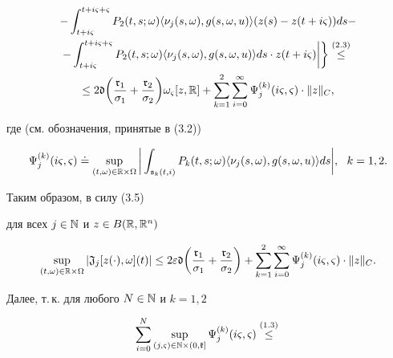 \begin{pf}
\begin{gather*}
-\int_{t+i\vsg}^{t+i\vsg+\vsg}


P_{2}(t,s;\om)\la\nu_{j}(s,\om),g(s,\om,u)\ra


(z(s)-z(t+i\vsg))ds-\\


%


-\int_{t+i\vsg}^{t+i\vsg+\vsg} P_{2}(t,s;\om)


\la\nu_{j}(s,\om),g(s,\om,u)\ra ds\cdot z(t+i\vsg)\bigg|\bigg\}


\overset{(2.3)}{\le}{} \\


%


\le 2\frak d\bigg(\frac{\frak r_{1}}{\sigma_{1}}+


\frac{\frak r_{2}}{\sigma_{2}}\bigg)\om_{\vsg}[z,\R]


+\sum\lt_{k=1}^{2}\sum\lt_{i=0}^{\infty}\Psi_{j}^{(k)}(i\vsg,\vsg)\cdot


\|z\|_{C},


\end{gather*}


где (см. обозначения, принятые в (3.2))


$$


\Psi_{j}^{(k)}(i\vsg,\vsg)\doteq\sup\lt_{(t,\om)\in\R\times\Om}


\bigg|\int_{\frak s_{k}(t,i)}P_{k}(t,s;\om)


\la\nu_{j}(s,\om),g(s,\om,u)\ra ds\bigg|,\ \ k=1,2.


$$


Таким образом, в силу (3.5)


для всех $j\in\Bbb N$ и $z\in B(\Bbb R,\Bbb R^{n})$


$$


\sup\lt_{(t,\om)\in\R\times\Om}|\frak J_{j}[z(\cdot),\om](t)|\le


2\ve\frak d\bigg(\frac{\frak r_{1}}{\sigma_{1}}+


\frac{\frak r_{2}}{\sigma_{2}}\bigg)+


\sum\lt_{k=1}^{2}\sum\lt_{i=0}^{\infty}


\Psi_{j}^{(k)}(i\vsg,\vsg)\cdot\|z\|_{C}.


$$


Далее, т.\,к. для любого $N \in \Bbb N$ и $k=1,2$


\begin{equation}


\sum\lt_{i=0}^{N}


\sup_{(j,\vsg)\in\Bbb N\times(0,\frak k]}


\Psi_{j}^{(k)}(i\vsg,\vsg)\overset{(1.3)}{\le}{}



\end{equation}
\end{pf}
